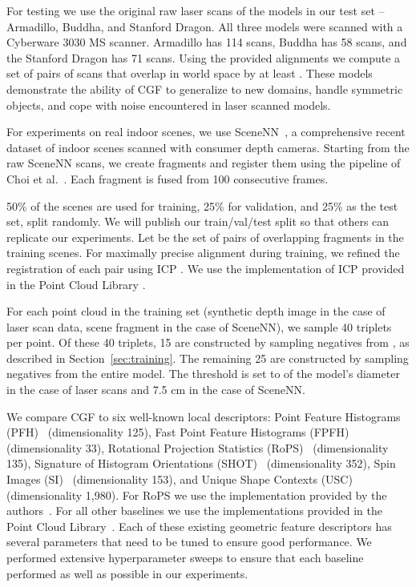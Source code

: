 For testing we use the original raw laser scans of the models in our test set -- Armadillo, Buddha, and Stanford Dragon. All three models were scanned with a Cyberware 3030 MS scanner. Armadillo has 114 scans, Buddha has 58 scans, and the Stanford Dragon has 71 scans. Using the provided alignments we compute a set of pairs of scans  that overlap in world space by at least .  These models demonstrate the ability of CGF to generalize to new domains, handle symmetric objects, and cope with noise encountered in laser scanned models.

For experiments on real indoor scenes, we use SceneNN~\cite{Scenenn2016}, a comprehensive recent dataset of indoor scenes scanned with consumer depth cameras. Starting from the raw SceneNN scans, we create fragments and register them using the pipeline of Choi et al.~\cite{Choi2015}. Each fragment is fused from 100 consecutive frames.

50\% of the scenes are used for training, 25\% for validation, and 25\% as the test set, split randomly. We will publish our train/val/test split so that others can replicate our experiments. Let  be the set of pairs of overlapping fragments in the training scenes. For maximally precise alignment during training, we refined the registration of each pair  using ICP \cite{Besl1992}. We use the implementation of ICP provided in the Point Cloud Library \cite{Holz2015}.




For each point cloud in the training set (synthetic depth image in the case of laser scan data, scene fragment in the case of SceneNN), we sample 40 triplets per point. Of these 40 triplets, 15 are constructed by sampling negatives from , as described in Section~\ref{sec:training}. The remaining 25 are constructed by sampling negatives from the entire model. The threshold  is set to  of the model's diameter in the case of laser scans and 7.5 cm in the case of SceneNN.



We compare CGF to six well-known local descriptors: Point Feature Histograms (PFH)~\cite{Rusu2008-IROS} (dimensionality 125),  Fast Point Feature Histograms (FPFH)~\cite{Rusu2009} (dimensionality 33), Rotational Projection Statistics (RoPS)~\cite{Guo2013} (dimensionality 135), Signature of Histogram Orientations (SHOT)~\cite{Salti2014} (dimensionality 352), Spin Images (SI)~\cite{JohnsonHebert1999} (dimensionality 153), and Unique Shape Contexts (USC)~\cite{Tombari2010b} (dimensionality 1,980). For RoPS we use the implementation provided by the authors~\cite{Guo2013}. For all other baselines we use the implementations provided in the Point Cloud Library~\cite{Holz2015}.
Each of these existing geometric feature descriptors has several parameters that need to be tuned to ensure good performance. We performed extensive hyperparameter sweeps to ensure that each baseline performed as well as possible in our experiments.

